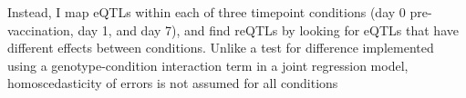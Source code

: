 
    
%


Instead, I map \glspl{eQTL} within each of three timepoint conditions (day 0 pre-vaccination, day 1, and day 7), and find \glspl{reQTL} by looking for \glspl{eQTL} that have different effects between conditions.
Unlike a test for difference implemented using a genotype-condition interaction term in a joint regression model, homoscedasticity of errors is not assumed for all conditions\autocite{clogg1995StatisticalMethodsComparing}

